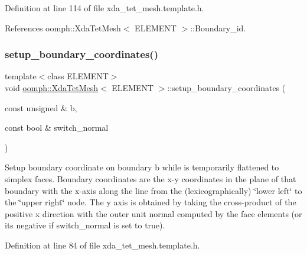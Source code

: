 Definition at line 114 of file xda\+\_\+tet\+\_\+mesh.\+template.\+h.



References oomph\+::\+Xda\+Tet\+Mesh$<$ E\+L\+E\+M\+E\+N\+T $>$\+::\+Boundary\+\_\+id.

\mbox{\label{classoomph_1_1XdaTetMesh_a3a09ba1d3e29133dd032519ced703815}} 
\subsubsection{\texorpdfstring{setup\+\_\+boundary\+\_\+coordinates()}{setup\_boundary\_coordinates()}\hspace{0.1cm}{\footnotesize\ttfamily [1/2]}}
{\footnotesize\ttfamily template$<$class E\+L\+E\+M\+E\+NT$>$ \\
void \hyperlink{classoomph_1_1XdaTetMesh}{oomph\+::\+Xda\+Tet\+Mesh}$<$ E\+L\+E\+M\+E\+NT $>$\+::setup\+\_\+boundary\+\_\+coordinates (\begin{DoxyParamCaption}\item[{const unsigned \&}]{b,  }\item[{const bool \&}]{switch\+\_\+normal }\end{DoxyParamCaption})\hspace{0.3cm}{\ttfamily [inline]}}



Setup boundary coordinate on boundary b while is temporarily flattened to simplex faces. Boundary coordinates are the x-\/y coordinates in the plane of that boundary with the x-\/axis along the line from the (lexicographically) \char`\"{}lower left\char`\"{} to the \char`\"{}upper right\char`\"{} node. The y axis is obtained by taking the cross-\/product of the positive x direction with the outer unit normal computed by the face elements (or its negative if switch\+\_\+normal is set to true). 



Definition at line 84 of file xda\+\_\+tet\+\_\+mesh.\+template.\+h.

\mbox{\label{classoomph_1_1XdaTetMesh_a415f0211f064766f8c38bca6f877c192}} 

